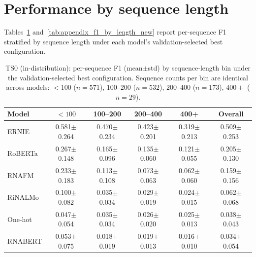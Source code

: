 \documentclass[logo,bsc,singlespacing,parskip]{infthesis}
\begin{document}
\section{Performance by sequence length}
\label{sec:appendix_length}

Tables~\ref{tab:appendix_f1_by_length_ts0} and~\ref{tab:appendix_f1_by_length_new} report per-sequence F1 stratified by sequence length under each model's validation-selected best configuration.

\begin{table}[H]
\centering
\small
\setlength{\tabcolsep}{6pt}
\caption{
TS0 (in-distribution): per-sequence F1 (mean$\pm$std) by sequence-length bin under the validation-selected best configuration.
Sequence counts per bin are identical across models: $<100$ ($n=571$), $100$--$200$ ($n=532$), $200$--$400$ ($n=173$), $400+$ ($n=29$).
}
\label{tab:appendix_f1_by_length_ts0}
\begin{tabular}{lccccc}
\toprule
Model & $<100$ & 100--200 & 200--400 & 400+ & Overall \\
\midrule
ERNIE   & 0.581$\pm$0.264 & 0.470$\pm$0.234 & 0.423$\pm$0.201 & 0.319$\pm$0.213 & 0.509$\pm$0.253 \\
RoBERTa & 0.267$\pm$0.148 & 0.165$\pm$0.096 & 0.135$\pm$0.060 & 0.121$\pm$0.055 & 0.205$\pm$0.130 \\
RNAFM   & 0.233$\pm$0.183 & 0.113$\pm$0.108 & 0.073$\pm$0.063 & 0.062$\pm$0.060 & 0.159$\pm$0.156 \\
RiNALMo & 0.100$\pm$0.082 & 0.035$\pm$0.034 & 0.029$\pm$0.019 & 0.024$\pm$0.015 & 0.062$\pm$0.068 \\
One-hot & 0.047$\pm$0.054 & 0.035$\pm$0.034 & 0.026$\pm$0.020 & 0.025$\pm$0.013 & 0.038$\pm$0.043 \\
RNABERT & 0.053$\pm$0.075 & 0.018$\pm$0.019 & 0.019$\pm$0.013 & 0.016$\pm$0.010 & 0.034$\pm$0.054 \\
\bottomrule
\end{tabular}
\end{table}
\end{document}
